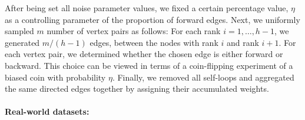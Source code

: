 After being set all noise parameter values, we fixed a certain percentage value, $\eta$ as a controlling parameter of the proportion of forward edges. 
Next, we uniformly sampled $m$ number of vertex pairs as follows:
For each rank $i = 1, \ldots, h - 1$, we generated $m / (h - 1)$ edges, between the nodes with rank $i$ and rank $i + 1$.
For each vertex pair, we determined whether the chosen edge is either forward or backward. 
This choice can be viewed in terms of a
coin-flipping experiment of a biased coin with probability $\eta$.
Finally, we removed all self-loops and aggregated the same directed edges together by assigning their accumulated  weights.




\paragraph{Real-world datasets:}


